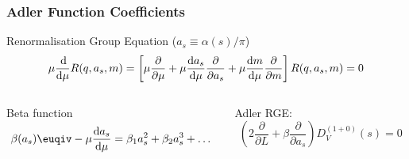 \documentclass{beamer}
\begin{document}
\begin{frame}
  \frametitle{Adler Function Coefficients}
  \begin{block}{Renormalisation Group Equation (\(a_s \equiv \alpha(s)/\pi\))}
    \begin{equation}
      \mu \frac{\dif}{\dif \mu} R(q, a_s, m) = \left[ \mu \frac{\partial}{\partial \mu} + \mu \frac{\dif a_s}{\dif \mu} \frac{\partial}{\partial a_s} + \mu \frac{\dif m}{\dif \mu} \frac{\partial}{\partial m} \right] R(q, a_s, m) = 0
    \end{equation}
  \end{block}

  \begin{scriptsize}
    \begin{columns}
      \begin{column}{.5\textwidth}
        Beta function
        \begin{equation}
          \beta(a_s) \euqiv -\mu \frac{\dif a_s}{\dif \mu} = \beta_1 a_s^2 + \beta_2 a_s^3 + \dots
        \end{equation}
      \end{column}
      \begin{column}{.5\textwidth}
        Adler RGE:
        \begin{equation}
          \left(2 \frac{\partial}{\partial L} + \beta \frac{\partial}{\partial a_s} \right) D_V^{(1+0)}(s) = 0
        \end{equation}
      \end{column}
    \end{columns}

    \vspace{0.3cm}
    \makebox[\linewidth]{\rule{\textwidth}{0.5pt}}


\end{scriptsize}
\end{frame}
\end{document}
